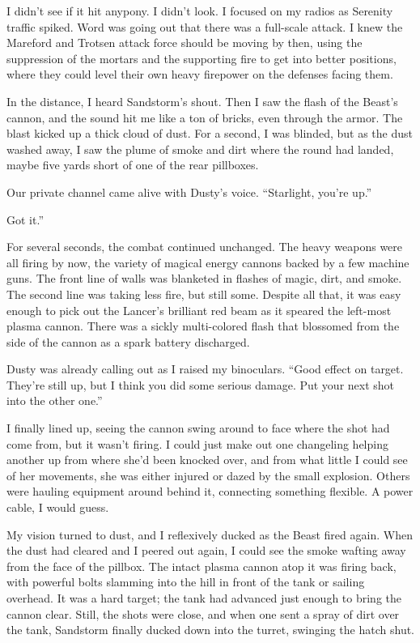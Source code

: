 I didn’t see if it hit anypony. I didn’t look. I focused on my radios as Serenity traffic spiked. Word was going out that there was a full-scale attack. I knew the Mareford and Trotsen attack force should be moving by then, using the suppression of the mortars and the supporting fire to get into better positions, where they could level their own heavy firepower on the defenses facing them.

In the distance, I heard Sandstorm’s shout. Then I saw the flash of the Beast’s cannon, and the sound hit me like a ton of bricks, even through the armor. The blast kicked up a thick cloud of dust. For a second, I was blinded, but as the dust washed away, I saw the plume of smoke and dirt where the round had landed, maybe five yards short of one of the rear pillboxes.

Our private channel came alive with Dusty’s voice. “Starlight, you’re up.”

\leavevmode{}Got it.”

For several seconds, the combat continued unchanged. The heavy weapons were all firing by now, the variety of magical energy cannons backed by a few machine guns. The front line of walls was blanketed in flashes of magic, dirt, and smoke. The second line was taking less fire, but still some. Despite all that, it was easy enough to pick out the Lancer’s brilliant red beam as it speared the left-most plasma cannon. There was a sickly multi-colored flash that blossomed from the side of the cannon as a spark battery discharged.

Dusty was already calling out as I raised my binoculars. “Good effect on target. They’re still up, but I think you did some serious damage. Put your next shot into the other one.”

I finally lined up, seeing the cannon swing around to face where the shot had come from, but it wasn’t firing. I could just make out one changeling helping another up from where she’d been knocked over, and from what little I could see of her movements, she was either injured or dazed by the small explosion. Others were hauling equipment around behind it, connecting something flexible. A power cable, I would guess.

My vision turned to dust, and I reflexively ducked as the Beast fired again. When the dust had cleared and I peered out again, I could see the smoke wafting away from the face of the pillbox. The intact plasma cannon atop it was firing back, with powerful bolts slamming into the hill in front of the tank or sailing overhead. It was a hard target; the tank had advanced just enough to bring the cannon clear. Still, the shots were close, and when one sent a spray of dirt over the tank, Sandstorm finally ducked down into the turret, swinging the hatch shut.

